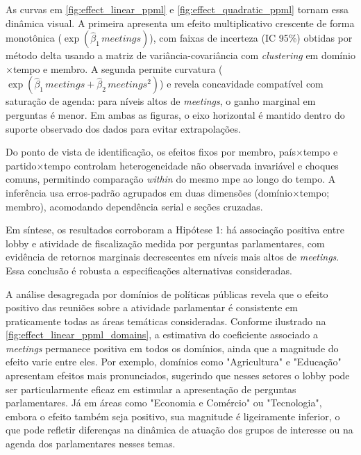 As curvas em \autoref{fig:effect_linear_ppml} e \autoref{fig:effect_quadratic_ppml} tornam essa dinâmica visual. A primeira apresenta um efeito multiplicativo crescente de forma monotônica (\(\exp(\hat{\beta}_1\,\allowbreak\textit{meetings})\)), com faixas de incerteza (IC 95\%) obtidas por método delta usando a matriz de variância-covariância com \textit{clustering} em domínio$\times$tempo e membro. A segunda permite curvatura (\(\exp(\hat{\beta}_1\,\allowbreak\textit{meetings}+\hat{\beta}_2\,\allowbreak\textit{meetings}^2)\)) e revela concavidade compatível com saturação de agenda: para níveis altos de \textit{meetings}, o ganho marginal em perguntas é menor. Em ambas as figuras, o eixo horizontal é mantido dentro do suporte observado dos dados para evitar extrapolações.

Do ponto de vista de identificação, os efeitos fixos por membro, país$\times$tempo e partido$\times$tempo controlam heterogeneidade não observada invariável e choques comuns, permitindo comparação \textit{within} do mesmo \acrshort{mpe} ao longo do tempo. A inferência usa erros-padrão agrupados em duas dimensões (domínio$\times$tempo; membro), acomodando dependência serial e seções cruzadas.

Em síntese, os resultados corroboram a Hipótese 1: há associação positiva entre lobby e atividade de fiscalização medida por perguntas parlamentares, com evidência de retornos marginais decrescentes em níveis mais altos de \textit{meetings}. Essa conclusão é robusta a especificações alternativas consideradas.

A análise desagregada por domínios de políticas públicas revela que o efeito positivo das reuniões sobre a atividade parlamentar é consistente em praticamente todas as áreas temáticas consideradas. Conforme ilustrado na \autoref{fig:effect_linear_ppml_domains}, a estimativa do coeficiente associado a \textit{meetings} permanece positiva em todos os domínios, ainda que a magnitude do efeito varie entre eles. Por exemplo, domínios como "Agricultura" e "Educação" apresentam efeitos mais pronunciados, sugerindo que nesses setores o lobby pode ser particularmente eficaz em estimular a apresentação de perguntas parlamentares. Já em áreas como "Economia e Comércio" ou "Tecnologia", embora o efeito também seja positivo, sua magnitude é ligeiramente inferior, o que pode refletir diferenças na dinâmica de atuação dos grupos de interesse ou na agenda dos parlamentares nesses temas.

